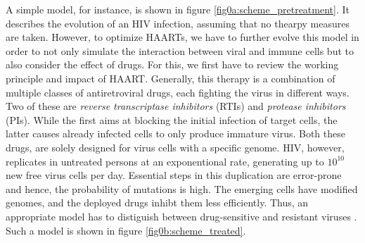 A simple model, for instance, is shown in figure \ref{fig0a:scheme_pretreatment}.
It describes the evolution of an HIV infection, assuming that no thearpy measures are taken.
However, to optimize HAARTs, we have to further evolve this model in order to not only simulate the interaction between viral and immune cells but 
to also consider the effect of drugs.
For this, we first have to review the working principle and impact of HAART.
Generally, this therapy is a combination of multiple classes of antiretroviral drugs, each fighting the virus in different ways.
Two of these are \textit{reverse transcriptase inhibitors} (RTIs) and \textit{protease inhibitors} (PIs).
While the first aims at blocking the initial infection of target cells, the latter causes already infected cells to only produce 
immature virus.
Both these drugs, are solely designed for virus cells with a specific genome.
HIV, however, replicates in untreated persons at an exponentional rate, generating up to $10^{10}$ new free virus 
cells per day. Essential steps in this duplication are error-prone and hence, the probability of mutations is high.
The emerging cells have modified genomes, and the deployed drugs inhibt them less efficiently.
Thus, an appropriate model has to distiguish between drug-sensitive and resistant viruses \cite{rong2007emergence}.
Such a model is shown in figure \ref{fig0b:scheme_treated}.\newline
